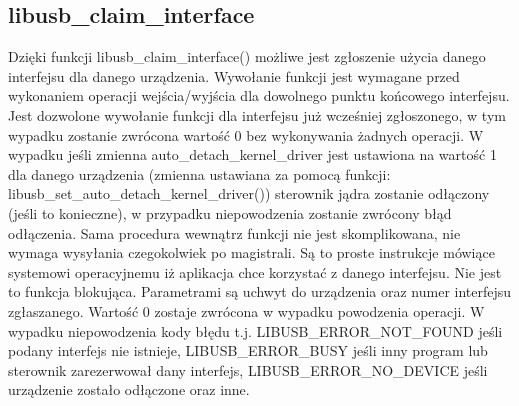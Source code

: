 \documentclass{BscUS}
\begin{document}
\subsection{libusb\_claim\_interface}
Dzięki funkcji libusb\_claim\_interface() możliwe jest zgłoszenie użycia danego interfejsu dla danego urządzenia.
\newline
Wywołanie funkcji jest wymagane przed wykonaniem operacji wejścia/wyjścia dla dowolnego punktu końcowego interfejsu.
\newline
Jest dozwolone wywołanie funkcji dla interfejsu już wcześniej zgłoszonego, w tym wypadku zostanie zwrócona wartość 0 bez wykonywania żadnych operacji.
\newline
W wypadku jeśli zmienna auto\_detach\_kernel\_driver jest ustawiona na wartość 1 dla danego urządzenia (zmienna ustawiana za pomocą funkcji: libusb\_set\_auto\_detach\_kernel\_driver()) sterownik jądra zostanie odłączony (jeśli to konieczne), w przypadku niepowodzenia zostanie zwrócony błąd odłączenia.
\newline
Sama procedura wewnątrz funkcji nie jest skomplikowana, nie wymaga wysyłania czegokolwiek po magistrali. Są to proste instrukcje mówiące systemowi operacyjnemu iż aplikacja chce korzystać z danego interfejsu.
\newline
Nie jest to funkcja blokująca.
\newline
Parametrami są uchwyt do urządzenia oraz numer interfejsu zgłaszanego.
\newline
Wartość 0 zostaje zwrócona w wypadku powodzenia operacji.
\newline
W wypadku niepowodzenia kody błędu t.j. LIBUSB\_ERROR\_NOT\_FOUND jeśli podany interfejs nie istnieje, LIBUSB\_ERROR\_BUSY jeśli inny program lub sterownik zarezerwował dany interfejs, LIBUSB\_ERROR\_NO\_DEVICE jeśli urządzenie zostało odłączone oraz inne.
\end{document}
